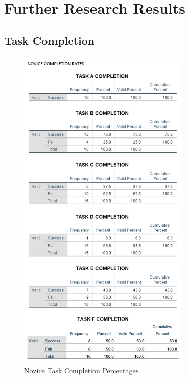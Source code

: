 \chapter{Further Research Results}
\section{Task Completion}
\begin{figure}[H]
\includegraphics[height=16cm]{Screenshots/UXResearchDataFiles/UXTaskCompletionData/novicePercentageCompletion.png}
\caption{Novice Task Completion Percentages}	
\end{figure}

